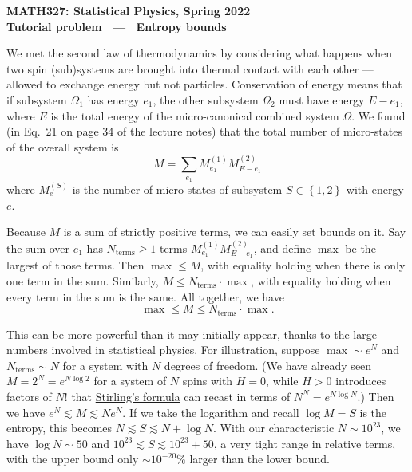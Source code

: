 \documentclass[12 pt]{article} %
\newcommand{\Om}{\ensuremath{\Omega} }
\begin{document}
\newcommand{\thisunit}{MATH327 Tutorial (Bounds)}
\newcommand{\moddate}{Last modified 13 Feb.~2022}
\begin{center}
  {\Large \textbf{MATH327: Statistical Physics, Spring 2022}} \\[12 pt]
  {\Large \textbf{Tutorial problem \ --- \ Entropy bounds}} \\[24 pt]
\end{center}

We met the second law of thermodynamics by considering what happens when two spin (sub)systems are brought into thermal contact with each other --- allowed to exchange energy but not particles.
Conservation of energy means that if subsystem $\Om_1$ has energy $e_1$, the other subsystem $\Om_2$ must have energy $E - e_1$, where $E$ is the total energy of the micro-canonical combined system $\Om$.
We found (in Eq.~21 on page 34 of the lecture notes) that the total number of micro-states of the overall system is
\begin{equation*}
  M = \sum_{e_1} M_{e_1}^{(1)} M_{E - e_1}^{(2)}
\end{equation*}
where $M_e^{(S)}$ is the number of micro-states of subsystem $S \in \left\{1, 2\right\}$ with energy $e$.

Because $M$ is a sum of strictly positive terms, we can easily set bounds on it.
Say the sum over $e_1$ has $N_{\text{terms}} \geq 1$ terms $M_{e_1}^{(1)} M_{E - e_1}^{(2)}$, and define $\max$ be the largest of those terms.
Then $\max \leq M$, with equality holding when there is only one term in the sum.
Similarly, $M \leq N_{\text{terms}} \cdot \max$, with equality holding when every term in the sum is the same.
All together, we have
\begin{equation*}
  \max \leq M \leq N_{\text{terms}} \cdot \max.
\end{equation*}

This can be more powerful than it may initially appear, thanks to the large numbers involved in statistical physics.
For illustration, suppose $\max \sim e^N$ and $N_{\text{terms}} \sim N$ for a system with $N$ degrees of freedom.
(We have already seen $M = 2^N = e^{N\log 2}$ for a system of $N$ spins with $H = 0$, while $H > 0$ introduces factors of $N!$ that \href{https://en.wikipedia.org/wiki/Stirling's_approximation}{Stirling's formula} can recast in terms of $N^N = e^{N\log N}$.)
Then we have $e^N \lesssim M \lesssim N e^N$.
If we take the logarithm and recall $\log M = S$ is the entropy, this becomes $N \lesssim S \lesssim N + \log N$.
With our characteristic $N \sim 10^{23}$, we have $\log N \sim 50$ and $10^{23} \lesssim S \lesssim 10^{23} + 50$, a very tight range in relative terms, with the upper bound only $\sim$$10^{-20}\%$ larger than the lower bound.
\end{document}
